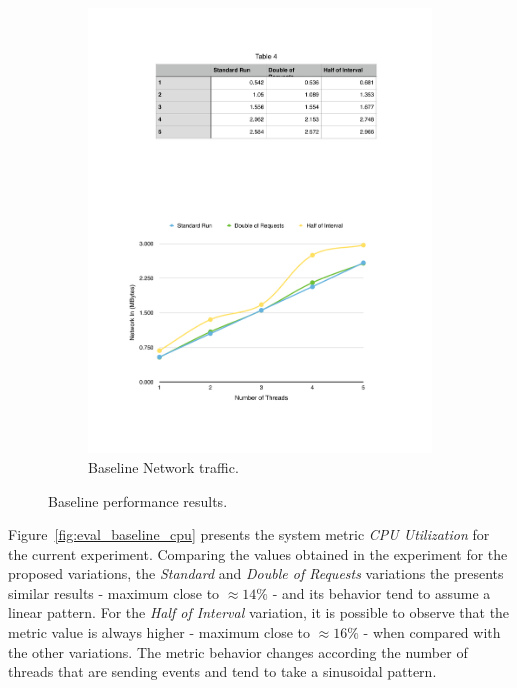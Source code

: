 \begin{figure}[ht!]
\begin{subfigure}{.5\textwidth}
  \includegraphics[width=\linewidth]{./images/network_1_lap}
  \caption{Baseline Network traffic.}
  \label{fig:eval_baseline_network}
\end{subfigure}
\caption{Baseline performance results.}
\label{fig:eval_baseline_results}
\end{figure}

Figure~\ref{fig:eval_baseline_cpu} presents the system metric \textit{CPU Utilization} for the current
experiment. Comparing the values obtained in the experiment for the proposed variations, the
\textit{Standard} and \textit{Double of Requests} variations the presents similar results -
maximum close to $\approx14\%$ - and its behavior tend to assume a linear pattern. For the \textit{Half of Interval}
variation, it is possible to observe that the metric value is always higher - maximum close to $\approx16\%$ -
when compared with the other variations. The metric behavior changes according the number of threads
that are sending events and tend to take a sinusoidal pattern.\\

